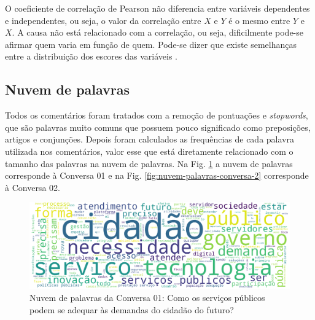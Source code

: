 O coeficiente  de correlação de Pearson não diferencia entre variáveis dependentes e independentes, ou seja, o valor da correlação entre $X$ e $Y$ é o mesmo entre $Y$ e $X$. A causa não está relacionado com a correlação, ou seja, dificilmente pode-se afirmar quem varia em função de quem. Pode-se dizer que existe semelhanças entre a distribuição dos escores das variáveis \cite{filho2009}.


\subsection{Nuvem de palavras}


Todos os comentários foram tratados com a remoção de pontuações e \textit{stopwords}, que são palavras muito comuns que possuem pouco significado como preposições, artigos e conjunções. Depois foram calculados as frequências de cada palavra utilizada nos comentários, valor esse que está diretamente relacionado com o tamanho das palavras na nuvem de palavras. Na Fig. \ref{fig:nuvem-palavras-conversa-1} a nuvem de palavras corresponde à Conversa 01 e na Fig. \ref{fig:nuvem-palavras-conversa-2} corresponde à Conversa 02.




\begin{figure}[!h]
	\centering
	\includegraphics[keepaspectratio=true,scale=0.1]{figuras/tcc2/nuvem/nuvem_palavras_conversa_1.png}
	\caption{Nuvem de palavras da Conversa 01: Como os serviços públicos podem se adequar às demandas do
cidadão do futuro?}
	\label{fig:nuvem-palavras-conversa-1}
\end{figure}



